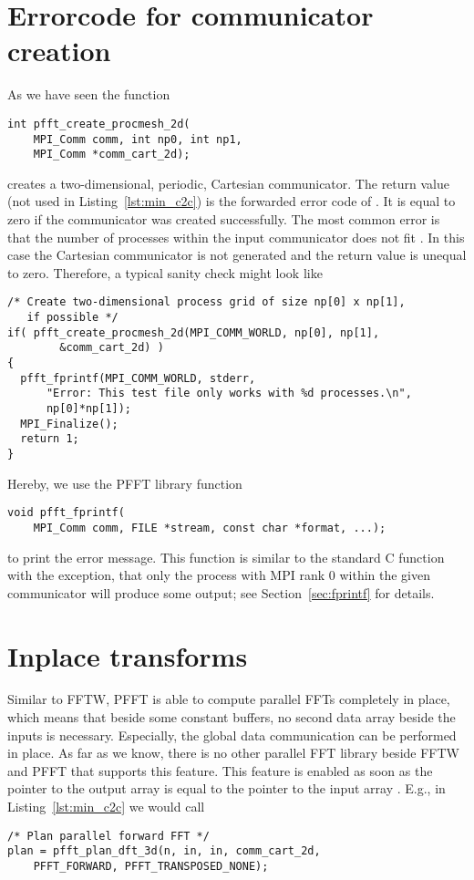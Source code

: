 \section{Errorcode for communicator creation}
As we have seen the function
\begin{lstlisting}
int pfft_create_procmesh_2d(
    MPI_Comm comm, int np0, int np1,
    MPI_Comm *comm_cart_2d);
\end{lstlisting}
creates a two-dimensional, periodic, Cartesian communicator. The  return value
(not used in Listing~\ref{lst:min_c2c}) is the forwarded error code of .
It is equal to zero if the communicator was created successfully.
The most common error is that the number of processes within the input
communicator  does not fit . In this case the Cartesian communicator
is not generated and the return value is unequal to zero. Therefore, a typical sanity check might look like
\begin{lstlisting}
/* Create two-dimensional process grid of size np[0] x np[1],
   if possible */
if( pfft_create_procmesh_2d(MPI_COMM_WORLD, np[0], np[1],
        &comm_cart_2d) )
{
  pfft_fprintf(MPI_COMM_WORLD, stderr,
      "Error: This test file only works with %d processes.\n",
      np[0]*np[1]);
  MPI_Finalize();
  return 1;
}
\end{lstlisting}
Hereby, we use the PFFT library function
\begin{lstlisting}
void pfft_fprintf(
    MPI_Comm comm, FILE *stream, const char *format, ...);
\end{lstlisting}
to print the error message.
This function is similar to the standard C function  with the exception, that only the process with MPI rank $0$
within the given communicator  will produce some output; see Section~\ref{sec:fprintf} for details.

\section{Inplace transforms}
Similar to FFTW, PFFT is able to compute parallel FFTs completely in place, which means that beside some
constant buffers, no second data array beside the inputs is necessary. Especially, the global data communication
can be performed in place. As far as we know, there is no other parallel FFT library beside FFTW and PFFT that
supports this feature. 
This feature is enabled as soon as the pointer to the output array  is equal to the pointer to the input array .
E.g., in Listing~\ref{lst:min_c2c} we would call
\begin{lstlisting}[firstnumber=34]
/* Plan parallel forward FFT */
plan = pfft_plan_dft_3d(n, in, in, comm_cart_2d,
    PFFT_FORWARD, PFFT_TRANSPOSED_NONE);
\end{lstlisting}


